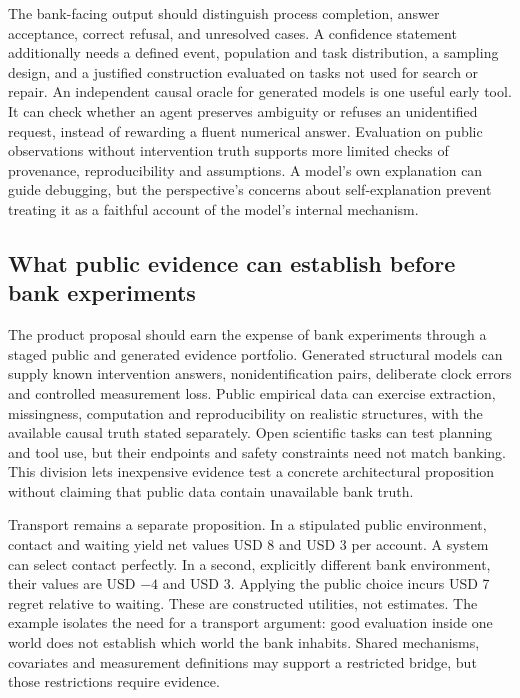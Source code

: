 The bank-facing output should distinguish process completion, answer acceptance,
correct refusal, and unresolved cases. A confidence statement additionally needs
a defined event, population and task distribution, a sampling design, and a
justified construction evaluated on tasks not used for search or repair. An
independent causal oracle for generated models is one useful early tool. It can
check whether an agent preserves ambiguity or refuses an unidentified request,
instead of rewarding a fluent numerical answer. Evaluation on public observations
without intervention truth supports more limited checks of provenance,
reproducibility and assumptions. A model's own explanation can guide debugging,
but the perspective's concerns about self-explanation prevent treating it as a
faithful account of the model's internal mechanism.

\subsection{What public evidence can establish before bank experiments}

The product proposal should earn the expense of bank experiments through a staged
public and generated evidence portfolio. Generated structural models can supply
known intervention answers, nonidentification pairs, deliberate clock errors and
controlled measurement loss. Public empirical data can exercise extraction,
missingness, computation and reproducibility on realistic structures, with the
available causal truth stated separately. Open scientific tasks can test planning
and tool use, but their endpoints and safety constraints need not match banking.
This division lets inexpensive evidence test a concrete architectural proposition
without claiming that public data contain unavailable bank truth.

Transport remains a separate proposition. In a stipulated public environment,
contact and waiting yield net values USD 8 and USD 3 per account. A system can
select contact perfectly. In a second, explicitly different bank environment,
their values are USD $-4$ and USD 3. Applying the public choice incurs USD 7
regret relative to waiting. These are constructed utilities, not estimates. The
example isolates the need for a transport argument: good evaluation inside one
world does not establish which world the bank inhabits. Shared mechanisms,
covariates and measurement definitions may support a restricted bridge, but
those restrictions require evidence.~\citep{exec24_scimethod_reference}

